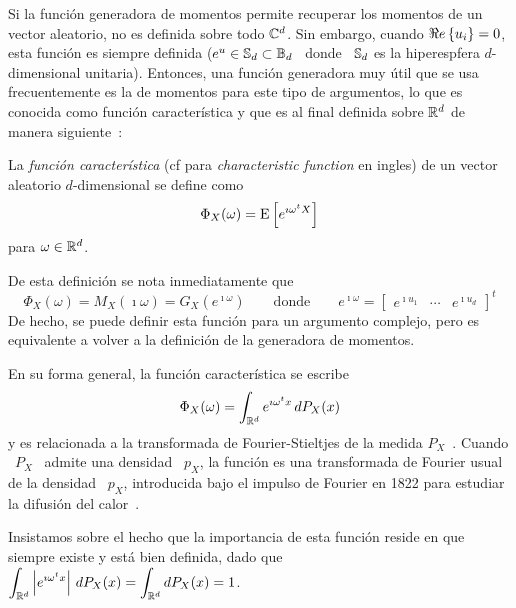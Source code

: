 
\label{Ssec:MP:FuncionCaracteristica}

Si  la funci\'on generadora  de momentos  permite recuperar  los momentos  de un
vector  aleatorio, no  es definida  sobre todo  $\mathbb{C}^d$.  Sin  embargo, cuando
$\Re e \left\{ u_i \right\} = 0$,  esta funci\'on es siempre definida  ($e^u \in \mathbb{S}_d \subset
\mathbb{B}_d$   \   donde   \    $\mathbb{S}_d$   es   la   hiperespfera   $d$-dimensional
unitaria).   Entonces,  una  funci\'on   generadora  muy   \'util  que   se  usa
frecuentemente  es la  de  momentos para  este  tipo de  argumentos,  lo que  es
conocida  como funci\'on  caracter\'istica  y  que es  al  final definida  sobre
$\mathbb{R}^d$  de  manera  siguiente~\cite{Luk61,  Gol61,  Fel68,  JohKot97,  Muk00,
  AthLah06}:

\begin{definicion}
\label{Def:MP:FuncionCaracteristica}
% 
  La {\em funci\'on caracter\'istica}  (cf para {\em characteristic function} en
  ingles) de un vector aleatorio $d$-dimensional se define como
  \[
  \Phi_X(\omega) = \operatorname{E}\left[ e^{\imath \omega^t X} \right]
  \]
  para $\omega \in \mathbb{R}^d$.
\end{definicion}
%
De esta definici\'on se nota inmediatamente que
%
\[
\Phi_X(\omega) = M_X(\imath \omega) = G_X\left( e^{\imath \omega} \right) \qquad
\mbox{donde} \qquad e^{\imath \omega}  = \begin{bmatrix} e^{\imath u_1} & \cdots
  & e^{\imath u_d} \end{bmatrix}^t
\]
%
De hecho,  se puede definir esta  funci\'on para un argumento  complejo, pero es
equivalente a volver a la definici\'on de la generadora de momentos.

En su forma general, la funci\'on caracter\'istica se escribe
%
\[
\Phi_X(\omega) = \int_{\mathbb{R}^d} e^{\imath \omega^t x} \, dP_X(x)
\]
%
y  es  relacionada   a  la  transformada  de  Fourier-Stieltjes   de  la  medida
$P_X$~\cite[Chap.~5]{Pin09}. Cuando  \ $P_X$ \  admite una densidad \  $p_X$, la
funci\'on  es  una  transformada  de  Fourier  usual de  la  densidad  \  $p_X$,
introducida bajo el  impulso de Fourier en 1822 para  estudiar la difusi\'on del
calor~\cite{Fou22}.

Insistamos sobre  el hecho que  la importancia de  esta funci\'on reside  en que
siempre existe y est\'a bien  definida, dado que \ $\displaystyle \int_{\mathbb{R}^d}
\left| e^{\imath \omega^t x} \right| \, dP_X(x) = \int_{\mathbb{R}^d} dP_X(x) = 1$.

